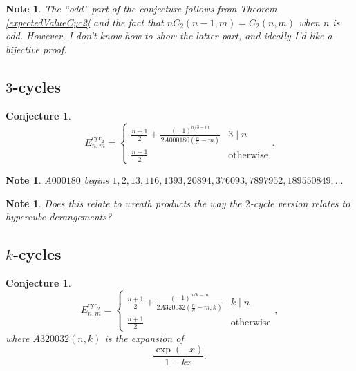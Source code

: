 \documentclass{article}
\newtheorem{conjecture}[theo]{Conjecture}
\newtheorem{note}[theo]{Note}
\begin{document}
  \begin{note}
    The ``odd'' part of the conjecture follows from Theorem
    \ref{expectedValueCyc2} and the fact that $nC_2(n-1,m) = C_2(n,m)$ when $n$ is odd.
    However, I don't know how to show the latter part, and ideally I'd like a bijective proof.
  \end{note}
  \subsection{$3$-cycles}
  \begin{conjecture}
    \begin{equation}
      E_{n,m}^{\text{cyc}_2} = \begin{cases}
        \displaystyle\frac{n+1}{2} + \frac{(-1)^{n/3-m}}{2 A000180(\frac n3 - m)} & 3 \mid n \\
        \displaystyle\frac{n+1}{2} & \text{otherwise}
      \end{cases}.
    \end{equation}
  \end{conjecture}
  \begin{note}
    $A000180$ begins $1, 2, 13, 116, 1393, 20894, 376093, 7897952, 189550849, \dots$
  \end{note}
  \begin{note}
    Does this relate to wreath products the way the $2$-cycle version relates 
    to hypercube derangements?
  \end{note}
  \subsection{$k$-cycles}
  \begin{conjecture}
    \begin{equation}
      E_{n,m}^{\text{cyc}_2} = \begin{cases}
        \displaystyle\frac{n+1}{2} + \frac{(-1)^{n/k-m}}{2 A320032(\frac nk - m, k)} & k \mid n \\
        \displaystyle\frac{n+1}{2} & \text{otherwise}
      \end{cases},
    \end{equation} where $A320032(n,k)$ is the expansion of \[
      \frac{\exp(-x)}{1 - kx}.
    \]
  \end{conjecture}
\end{document}

